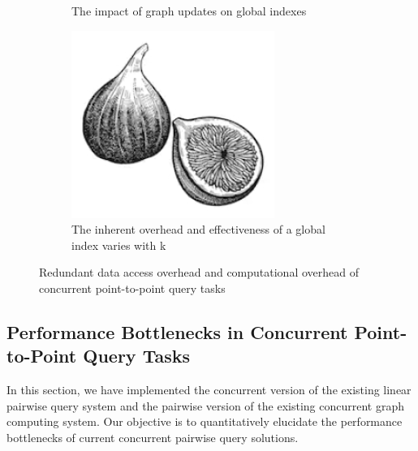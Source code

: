 \documentclass[lettersize,journal]{IEEEtran} %
\begin{document}
\begin{figure}[!t]
\begin{subfigure}{0.3\columnwidth}
      \caption{The impact of graph updates on global indexes}
      \label{fig:subfig5}
    \end{subfigure}
    \hfill
    \begin{subfigure}{0.3\columnwidth}
      \includegraphics[width=\linewidth]{fig1.png}
      \caption{The inherent overhead and effectiveness of a global index varies with k}
      \label{fig:subfig6}
    \end{subfigure}
  
    \caption{Redundant data access overhead and computational overhead of concurrent point-to-point query tasks}
    \label{fig:overall}
  \end{figure}
  
  

\subsection{Performance Bottlenecks in Concurrent Point-to-Point Query Tasks}
In this section, we have implemented the concurrent version of the existing linear pairwise query system\cite{pnp}\cite{tripoline}\cite{sgraph} and the pairwise version of the existing concurrent graph computing system\cite{glign}. Our objective is to quantitatively elucidate the performance bottlenecks of current concurrent pairwise query solutions.
\end{document}
